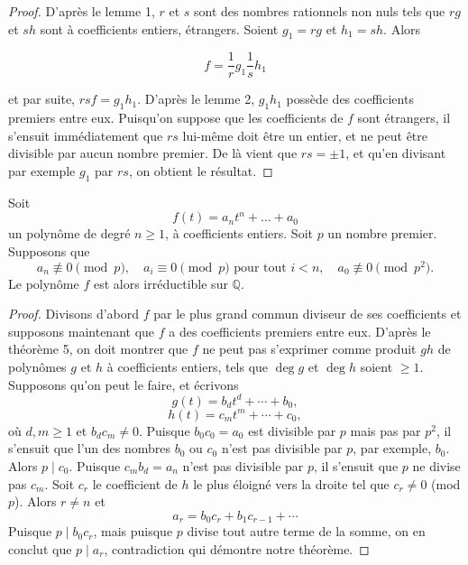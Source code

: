 \begin{proof}
    D’après le lemme 1, \(r\) et \(s\) sont des nombres rationnels non nuls tels que \(rg\) et \(sh\) sont à coefficients entiers, étrangers. Soient \(g_1 = rg\) et \(h_1 = sh\). Alors
    
    \[
    f = \frac{1}{r} g_1 \frac{1}{s} h_1
    \]
    
    et par suite, \(rsf = g_1 h_1\). D’après le lemme 2, \(g_1 h_1\) possède des coefficients premiers entre eux. Puisqu’on suppose que les coefficients de \(f\) sont étrangers, il s’ensuit immédiatement que \(rs\) lui-même doit être un entier, et ne peut être divisible par aucun nombre premier. De là vient que \(rs = \pm 1\), et qu’en divisant par exemple \(g_1\) par \(rs\), on obtient le résultat.
\end{proof}

\begin{theoreme}
    Soit
    \[
    f(t) = a_n t^n + \dots + a_0
    \]
    un polynôme de degré \(n \geq 1\), à coefficients entiers. Soit \(p\) un nombre premier. Supposons que
    \[
    a_n \not\equiv 0 \pmod{p}, \quad a_i \equiv 0 \pmod{p} \text{ pour tout } i < n, \quad a_0 \not\equiv 0 \pmod{p^2}.
    \]
    Le polynôme \(f\) est alors irréductible sur \(\mathbb{Q}\).
\end{theoreme}
    
\begin{proof}
    Divisons d’abord \( f \) par le plus grand commun diviseur de ses coefficients et supposons maintenant que \( f \) a des coefficients premiers entre eux. D’après le théorème 5, on doit montrer que \( f \) ne peut pas s’exprimer comme produit \( gh \) de polynômes \( g \) et \( h \) à coefficients entiers, tels que \( \deg g \) et \( \deg h \) soient \( \geq 1 \). Supposons qu’on peut le faire, et écrivons
    \[
    g(t) = b_d t^d + \cdots + b_0,
    \]
    \[
    h(t) = c_m t^m + \cdots + c_0,
    \]
    où \( d, m \geq 1 \) et \( b_d c_m \neq 0 \). Puisque \( b_0 c_0 = a_0 \) est divisible par \( p \) mais pas par \( p^2 \), il s’ensuit que l’un des nombres \( b_0 \) ou \( c_0 \) n’est pas divisible par \( p \), par exemple, \( b_0 \). 
    Alors \( p \mid c_0 \). Puisque \( c_m b_d = a_n \) n’est pas divisible par \( p \), il s’ensuit que \( p \) ne divise pas \( c_m \). Soit \( c_r \) le coefficient de \( h \) le plus éloigné vers la droite tel que \( c_r \neq 0 \) (mod \( p \)). 
    Alors \( r \neq n \) et 
    \[
    a_r = b_0 c_r + b_1 c_{r-1} + \cdots
    \]
    Puisque \( p \mid b_0 c_r \), mais puisque \( p \) divise tout autre terme de la somme, on en conclut que \( p \mid a_r \), contradiction qui démontre notre théorème.
\end{proof}


